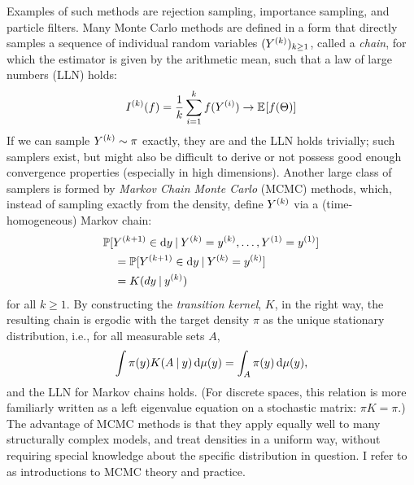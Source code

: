 Examples of such methods are rejection sampling, importance sampling, and particle filters.  Many
Monte Carlo methods are defined in a form that directly samples a sequence of individual random
variables \((Y^{(k)})_{k \ge 1}\), called a \emph{chain}, for which the estimator is given by the
arithmetic mean, such that a law of large numbers (LLN) holds:
\begin{equation}
  \label{eq:mc-lln}
  \kth{I}(f) = \frac{1}{k} \sum_{i=1}^{k} f(\kth[i]{Y}) \to \Exp{f(\Theta)}
\end{equation}
If we can sample \(Y^{(k)} \sim \pi\) exactly, they are \iid{} and the LLN holds trivially; such
samplers exist, but might also be difficult to derive or not possess good enough convergence
properties (especially in high dimensions).  Another large class of samplers is formed by
\emph{Markov Chain Monte Carlo} (MCMC) methods, which, instead of sampling exactly from the density,
define \(Y^{(k)}\) via a (time-homogeneous) Markov chain:
\begin{equation}
  \label{eq:mc-kernel}
  \begin{aligned}
    &\Prob{\kth[k+1]{Y} \in \dif y
      \given \kth{Y} = \kth{y}, \ldots, \kth[1]{Y} = \kth[1]{y}} \\
    &\quad = \Prob{\kth[k+1]{Y} \in \dif y \given \kth{Y} = \kth{y}}  \\
    &\quad = K(dy \given \kth{y}) \\
  \end{aligned}
\end{equation}
for all \(k \ge 1\).  By constructing the \emph{transition kernel}, \(K\), in the right way, the
resulting chain is ergodic with the target density \(\pi\) as the unique stationary distribution,
i.e., for all measurable sets \(A\),
\begin{equation}
  \label{eq:stationarity}
  \int \pi(y) K(A \given y) \dif\mu(y) = \int_A \pi(y) \dif\mu(y),
\end{equation}
and the LLN for Markov chains holds.  (For discrete spaces, this relation is more familiarly written
as a left eigenvalue equation on a stochastic matrix: \(\pi K = \pi\).)  The advantage of MCMC
methods is that they apply equally well to many structurally complex models, and treat densities in
a uniform way, without requiring special knowledge about the specific distribution in question.  I
refer to \textcites[chapter 6]{vihola2020lectures}{robert1999monte}[chapters 24 and
following]{murphy2012machine} as introductions to MCMC theory and practice.

